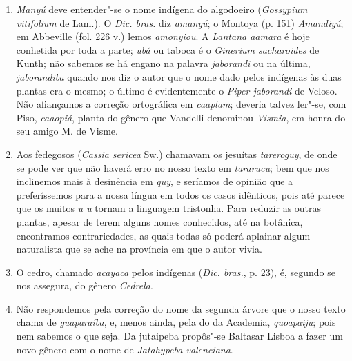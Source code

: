\begin{enumerate}
\item  \textit{Manyú} deve entender"-se o nome indígena do algodoeiro (\textit{Gossypium vitifolium} de 
Lam.). O \textit{Dic. bras.} diz \textit{amanyú}; o Montoya (p. 151) \textit{Amandiyú}; em Abbeville (fol. 226 v.) 
lemos \textit{amonyiou}. A \textit{Lantana aamara} é hoje conhetida por toda a parte; \textit{ubá} ou taboca é o 
\textit{Ginerium sacharoides} de Kunth; não sabemos se há 
engano na palavra \textit{jaborandi} ou na última, \textit{jaborandiba} quando nos diz o autor que o 
nome dado pelos indígenas às duas plantas era o mesmo; o último é evidentemente o 
\textit{Piper jaborandi} de Veloso. Não afiançamos a correção ortográfica em \textit{caaplam}; deveria talvez ler"-se, com Piso, \textit{caaopiá}, planta do gênero que Vandelli denominou \textit{Vismia}, em honra do seu 
amigo M. de Visme.

\item Aos fedegosos (\textit{Cassia sericea} Sw.) chamavam os jesuítas \textit{tareroguy}, de onde se 
pode ver que não haverá erro no nosso texto em \textit{tararucu}; bem que nos inclinemos mais 
à desinência em \textit{quy}, e seríamos de opinião que a preferíssemos para a nossa língua em 
todos os casos idênticos, pois até parece que os muitos \textit{u u} tornam a linguagem 
tristonha. Para reduzir as outras plantas, apesar de terem alguns nomes conhecidos, até 
na botânica, encontramos contrariedades, as quais todas só poderá aplainar algum 
naturalista que se ache na província em que o autor vivia.

\item O cedro, chamado \textit{acayaca} pelos indígenas (\textit{Dic. bras.}, p. 23), é, segundo se nos 
assegura, do gênero \textit{Cedrela}.

\item Não respondemos pela correção do nome da segunda árvore que o nosso texto 
chama de \textit{guaparaíba}, e, menos ainda, pela do da Academia, \textit{quoapaiju}; pois nem 
sabemos o que seja. Da jutaipeba propôs"-se Baltasar Lisboa a fazer um novo gênero 
com o nome de \textit{Jatahypeba valenciana}.


\end{enumerate}

